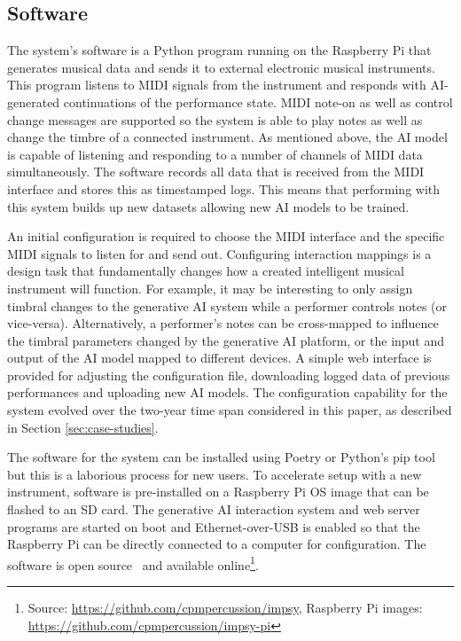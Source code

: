 \documentclass[sigconf]{nimeart}
\begin{document}

\subsection{Software}

The system's software is a Python program running on the Raspberry Pi that generates musical data and sends it to external electronic musical instruments.
This program listens to MIDI signals from the instrument and responds with AI-generated continuations of the performance state.
MIDI note-on as well as control change messages are supported so the system is able to play notes as well as change the timbre of a connected instrument.
As mentioned above, the AI model is capable of listening and responding to a number of channels of MIDI data simultaneously.
The software records all data that is received from the MIDI interface and stores this as timestamped logs. 
This means that performing with this system builds up new datasets allowing new AI models to be trained.

An initial configuration is required to choose the MIDI interface and the specific MIDI signals to listen for and send out. 
Configuring interaction mappings is a design task that fundamentally changes how a created intelligent musical instrument will function. 
For example, it may be interesting to only assign timbral changes to the generative AI system while a performer controls notes (or vice-versa). 
Alternatively, a performer's notes can be cross-mapped to influence the timbral parameters changed by the generative AI platform, or the input and output of the AI model mapped to different devices.
A simple web interface is provided for adjusting the configuration file, downloading logged data of previous performances and uploading new AI models.
The configuration capability for the system evolved over the two-year time span considered in this paper, as described in Section \ref{sec:case-studies}.

The software for the system can be installed using Poetry or Python's pip tool but this is a laborious process for new users. 
To accelerate setup with a new instrument, software is pre-installed on a Raspberry Pi OS image that can be flashed to an SD card. 
The generative AI interaction system and web server programs are started on boot and Ethernet-over-USB is enabled so that the Raspberry Pi can be directly connected to a computer for configuration.
The software is open source~\cite{impsy_software_zenodo} and available online\footnote{Source: \url{https://github.com/cpmpercussion/impsy}, Raspberry Pi images: \url{https://github.com/cpmpercussion/impsy-pi}}.
\end{document}
